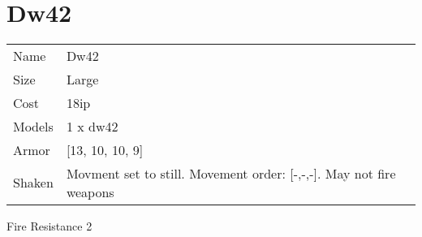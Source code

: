  
\ \\













\clearpage

\section{ Dw42 }

\begin{tabular}{ll}
  Name & Dw42 \\
  Size & Large\\
  Cost & 18ip\\
  Models & 1 x dw42\\
  Armor & [13, 10, 10, 9]\\
  Shaken & Movment set to still. Movement order: [-,-,-]. May not fire weapons\\
\end{tabular}

\noindent Fire Resistance 2\\ 


